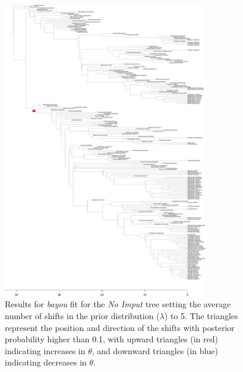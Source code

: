 \begin{figure}[H]
\includegraphics[width=0.8\textwidth]{img/plots-noimput-k5-1.pdf}
\caption{Results for \textit{bayou} fit for the \textit{No Imput} tree setting the average number of shifts in the prior distribution ($\lambda$) to 5. The triangles represent the position and direction of the shifts with posterior probability higher than 0.1, with upward triangles (in red) indicating increases in $\theta$, and downward triangles (in blue) indicating decreases in $\theta$.}
\label{fig:noimput-k5}
\end{figure}

\newpage

